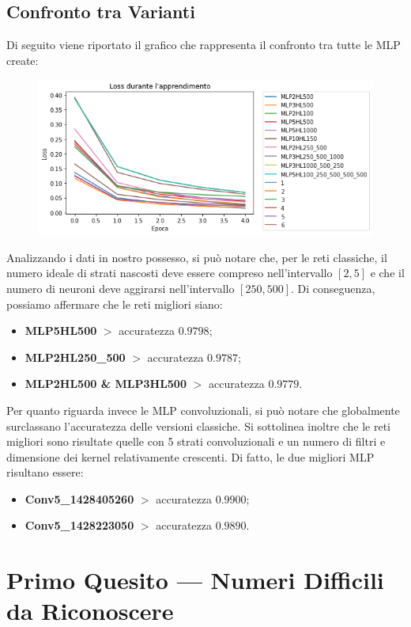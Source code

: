 \documentclass[12pt, a4paper]{article}
\begin{document}
\subsection{Confronto tra Varianti}
Di seguito viene riportato il grafico che rappresenta il confronto tra tutte le MLP create:
\begin{figure}[H]
    \centering
    \includegraphics[width=\textwidth]{ConfrontoTotale.png}
\end{figure}
Analizzando i dati in nostro possesso, si può notare che, per le reti classiche, il numero ideale di strati nascosti deve essere compreso nell'intervallo \([2, 5]\) e che il numero di neuroni deve aggirarsi nell'intervallo \([250 , 500]\).
Di conseguenza, possiamo affermare che le reti migliori siano:
\begin{itemize}
    \item \textbf{MLP5HL500} \(>\) accuratezza \(0.9798\);
    \item \textbf{MLP2HL250\_500} \(>\) accuratezza \(0.9787\);
    \item \textbf{MLP2HL500 \& MLP3HL500} \(>\) accuratezza \(0.9779\).
\end{itemize} 

Per quanto riguarda invece le MLP convoluzionali, si può notare che globalmente surclassano l'accuratezza delle versioni classiche. Si sottolinea inoltre che le reti migliori sono risultate quelle con 5 strati convoluzionali e un numero di filtri e dimensione dei kernel relativamente crescenti. Di fatto, le due migliori MLP risultano essere:
\begin{itemize}
    \item \textbf{Conv5\_1428405260} \(>\) accuratezza \(0.9900\);
    \item \textbf{Conv5\_1428223050} \(>\) accuratezza \(0.9890\).
\end{itemize}

\newpage
\section{Primo Quesito --- Numeri Difficili da Riconoscere}
\end{document}

